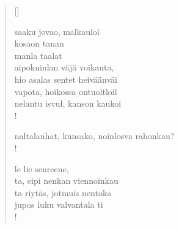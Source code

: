 \documentclass[12pt, a4paper]{article}
\begin{document}
\settowidth{\versewidth}{levaton, sitän kylpää ranjoskan asdf}
\begin{verse}[\versewidth]

saaku jovao, malkaulol \\
kosaon tanan \\
manla taalat \\
aipokuinlan väjä voikauta, \\
hio asalas sentet heiväänväi \\
vapota, hoikossa ontuoltloil \\
nelantu isvul, kanson kaukoi \\!



naltalanhat, kunsako, noinlosva rahonkau? \\!



le lie senreene, \\
ta, eipi nenkan viennoinkau \\
ta riytäs, jotmuis nentoka \\
jupos luku valvantala ti \\!


\end{verse}
\newpage
\end{document}
